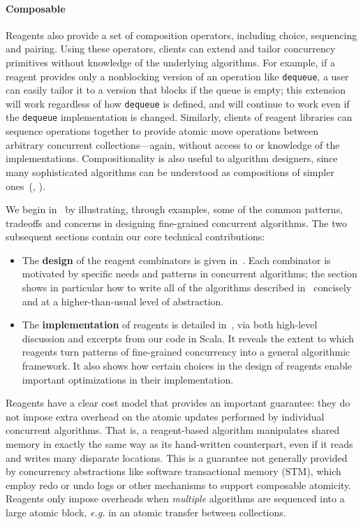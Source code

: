\documentclass[preprint,nocopyrightspace]{sigplanconf}
\begin{document}
\paragraph{Composable}
Reagents also provide a set of composition operators, including choice,
sequencing and pairing.  Using these operators, clients can extend and tailor
concurrency primitives without knowledge of the underlying algorithms.  For
example, if a reagent provides only a nonblocking version of an operation like
\lstinline{dequeue}, a user can easily tailor it to a version that blocks if the
queue is empty; this extension will work regardless of how \lstinline{dequeue}
is defined, and will continue to work even if the \lstinline{dequeue}
implementation is changed.  Similarly, clients of reagent libraries can sequence
operations together to provide atomic move operations between arbitrary
concurrent collections---again, without access to or knowledge of the
implementations.  Compositionality is also useful to algorithm designers, since
many sophisticated algorithms can be understood as compositions of simpler
ones~(, ).

\vskip 6pt
\noindent
We begin in~ by illustrating, through examples, some of the
common patterns, tradeoffs and concerns in designing fine-grained concurrent
algorithms.  The two subsequent sections contain our core technical
contributions:
\begin{itemize}
\item The \textbf{design} of the reagent combinators is given
  in~.  Each combinator is motivated by specific needs and
  patterns in concurrent algorithms; the section shows in
  particular how to write all of the algorithms described in~
  concisely and at a higher-than-usual level of abstraction.
\item The \textbf{implementation} of reagents is detailed
  in~, via both high-level discussion and excerpts from
  our code in Scala.  It reveals the extent to which reagents turn patterns of
  fine-grained concurrency into a general algorithmic framework.  It also shows
  how certain choices in the design of reagents enable important optimizations
  in their implementation.
\end{itemize}
Reagents have a clear cost model that provides an important guarantee: they do
not impose extra overhead on the atomic updates performed by individual
concurrent algorithms.  That is, a reagent-based algorithm manipulates shared
memory in exactly the same way as its hand-written counterpart, even if it reads
and writes many disparate locations.  This is a guarantee not generally provided
by concurrency abstractions like software transactional memory (STM), which
employ redo or undo logs or other mechanisms to support composable atomicity.
Reagents only impose overheads when \emph{multiple} algorithms are sequenced
into a large atomic block, \emph{e.g.}  in an atomic transfer between
collections.
\end{document}

